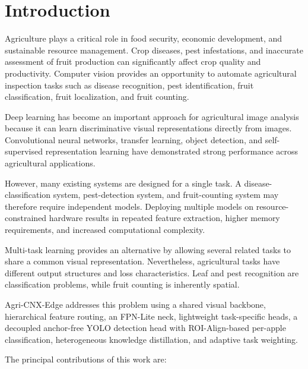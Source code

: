 \documentclass[preprint,12pt]{elsarticle}
\begin{document}
\section{Introduction}
\label{sec:introduction}

Agriculture plays a critical role in food security, economic development,
and sustainable resource management. Crop diseases, pest infestations,
and inaccurate assessment of fruit production can significantly affect
crop quality and productivity. Computer vision provides an opportunity to
automate agricultural inspection tasks such as disease recognition,
pest identification, fruit classification, fruit localization, and
fruit counting.

Deep learning has become an important approach for agricultural image
analysis because it can learn discriminative visual representations
directly from images. Convolutional neural networks, transfer learning,
object detection, and self-supervised representation learning have
demonstrated strong performance across agricultural applications.

However, many existing systems are designed for a single task. A
disease-classification system, pest-detection system, and fruit-counting
system may therefore require independent models. Deploying multiple
models on resource-constrained hardware results in repeated feature
extraction, higher memory requirements, and increased computational
complexity.

Multi-task learning provides an alternative by allowing several related
tasks to share a common visual representation. Nevertheless, agricultural
tasks have different output structures and loss characteristics. Leaf and
pest recognition are classification problems, while fruit counting is
inherently spatial.

Agri-CNX-Edge addresses this problem using a shared visual backbone,
hierarchical feature routing, an FPN-Lite neck, lightweight
task-specific heads, a decoupled anchor-free YOLO detection head with
ROI-Align-based per-apple classification, heterogeneous knowledge
distillation, and adaptive task weighting.

The principal contributions of this work are:
\end{document}
